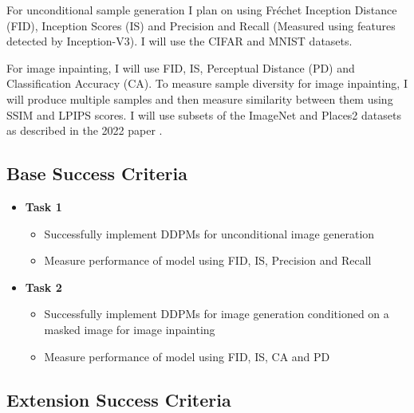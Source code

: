 \documentclass{article}
\begin{document}
For unconditional sample generation I plan on using Fréchet Inception Distance (FID), Inception Scores (IS) and Precision and Recall (Measured using features detected by Inception-V3). I will use the CIFAR and MNIST datasets.

For image inpainting, I will use FID, IS, Perceptual Distance (PD) and Classification Accuracy (CA). To measure sample diversity for image inpainting, I will produce multiple samples and then measure similarity between them using SSIM and LPIPS scores. I will use subsets of the ImageNet and Places2 datasets as described in the 2022 paper \cite{Saharia-2022}.

\subsection{Base Success Criteria}

\begin{itemize}
    \item \textbf{Task 1}
    \begin{itemize}
        \item Successfully implement DDPMs for unconditional image generation
        \item Measure performance of model using FID, IS, Precision and Recall
    \end{itemize}
    \item \textbf{Task 2}
    \begin{itemize}
        \item Successfully implement DDPMs for image generation conditioned on a masked image for image inpainting
        \item Measure performance of model using FID, IS, CA and PD
    \end{itemize}
\end{itemize}

\subsection{Extension Success Criteria}
\end{document}
